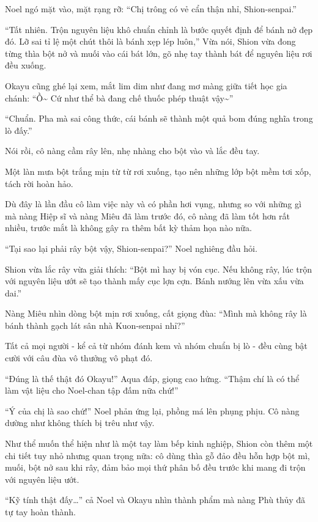 \documentclass[../main.tex]{subfiles}
\begin{document}
Noel ngó mặt vào, mặt rạng rỡ: ``Chị trông có vẻ cẩn thận nhỉ, Shion-senpai.''

``Tất nhiên. Trộn nguyên liệu khô chuẩn chỉnh là bước quyết định để bánh nở đẹp đó. Lỡ sai tỉ lệ một chút thôi là bánh xẹp lép luôn,'' Vừa nói, Shion vừa đong từng thìa bột nở và muối vào cái bát lớn, gõ nhẹ tay thành bát để nguyên liệu rơi đều xuống.

Okayu cũng ghé lại xem, mắt lim dim như đang mơ màng giữa tiết học gia chánh: ``Ồ\~{} Cứ như thể bà đang chế thuốc phép thuật vậy\~{}''

``Chuẩn. Pha mà sai công thức, cái bánh sẽ thành một quả bom đúng nghĩa trong lò đấy.''

Nói rồi, cô nàng cầm rây lên, nhẹ nhàng cho bột vào và lắc đều tay.

Một làn mưa bột trắng mịn từ từ rơi xuống, tạo nên những lớp bột mềm tơi xốp, tách rời hoàn hảo.

Dù đây là lần đầu cô làm việc này và có phần hơi vụng, nhưng so với những gì mà nàng Hiệp sĩ và nàng Miêu đã làm trước đó, cô nàng đã làm tốt hơn rất nhiều, trước mắt là không gây ra thêm bất kỳ thảm họa nào nữa.

``Tại sao lại phải rây bột vậy, Shion-senpai?'' Noel nghiêng đầu hỏi.

Shion vừa lắc rây vừa giải thích: ``Bột mì hay bị vón cục. Nếu không rây, lúc trộn với nguyên liệu ướt sẽ tạo thành mấy cục lợn cợn. Bánh nướng lên vừa xấu vừa dai.''

Nàng Miêu nhìn dòng bột mịn rơi xuống, cất giọng đùa: ``Mình mà không rây là bánh thành gạch lát sân nhà Kuon-senpai nhỉ?''

Tất cả mọi người - kể cả từ nhóm đánh kem và nhóm chuẩn bị lò - đều cùng bật cười với câu đùa vô thưởng vô phạt đó.

``Đúng là thế thật đó Okayu!'' Aqua đáp, giọng cao hứng. ``Thậm chí là có thể làm vật liệu cho Noel-chan tập đấm nữa chứ!''

``Ý của chị là sao chứ!'' Noel phản ứng lại, phồng má lên phụng phịu. Cô nàng dường như không thích bị trêu như vậy.

Như thể muốn thể hiện như là một tay làm bếp kinh nghiệp, Shion còn thêm một chi tiết tuy nhỏ nhưng quan trọng nữa: cô dùng thìa gỗ đảo đều hỗn hợp bột mì, muối, bột nở sau khi rây, đảm bảo mọi thứ phân bố đều trước khi mang đi trộn với nguyên liệu ướt.

``Kỹ tính thật đấy\dots'' cả Noel và Okayu nhìn thành phẩm mà nàng Phù thủy đã tự tay hoàn thành.
\end{document}
